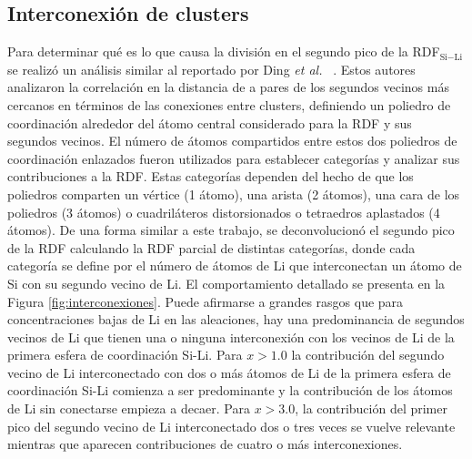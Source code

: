 \subsection{Interconexión de clusters}\label{s:interconexion}

Para determinar qué es lo que causa la división en el segundo pico de la 
RDF$_{\text{Si}-\text{Li}}$ se realizó un análisis similar al reportado por Ding \textit{et al.}
~\cite{ding2015}. Estos autores analizaron la correlación en la distancia de a
pares de los segundos vecinos más cercanos en términos de las conexiones entre
clusters, definiendo un poliedro de coordinación alrededor del átomo central 
considerado para la RDF y sus segundos vecinos. El número de átomos compartidos
entre estos dos poliedros de coordinación enlazados fueron utilizados para 
establecer categorías y analizar sus contribuciones a la RDF. Estas categorías
dependen del hecho de que los poliedros comparten un vértice (1 átomo), una 
arista (2 átomos), una cara de los poliedros (3 átomos) o cuadriláteros 
distorsionados o tetraedros aplastados (4 átomos). De una forma similar a este 
trabajo, se deconvolucionó el segundo pico de la RDF calculando la RDF parcial 
de distintas categorías, donde cada categoría se define por el número de átomos de
Li que interconectan un átomo de Si con su segundo vecino de Li. El comportamiento
detallado se presenta en la Figura \ref{fig:interconexiones}. Puede afirmarse a 
grandes rasgos que para concentraciones bajas de Li en las aleaciones, hay una 
predominancia de segundos vecinos de Li que tienen una o ninguna interconexión 
con los vecinos de Li de la primera esfera de coordinación Si-Li. Para $x > 1.0$
la contribución del segundo vecino de Li interconectado con dos o más átomos de 
Li de la primera esfera de coordinación Si-Li comienza a ser predominante y la
contribución de los átomos de Li sin conectarse empieza a decaer. Para $x > 3.0$,
la contribución del primer pico del segundo vecino de Li interconectado dos o
tres veces se vuelve relevante mientras que aparecen contribuciones de cuatro o
más interconexiones.
